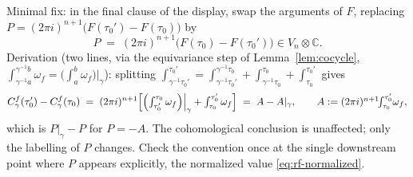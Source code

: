 \documentclass[11pt]{article}
\newcommand{\CC}{\mathbb{C}}
\begin{document}
\noindent
Minimal fix: in the final clause of the display, swap the arguments of
$F$, replacing $P = (2\pi i)^{n+1}\bigl(F(\tau_0') - F(\tau_0)\bigr)$ by
\[
  P \;=\; (2\pi i)^{n+1}\bigl(F(\tau_0) - F(\tau_0')\bigr) \in V_n
  \otimes \CC .
\]
Derivation (two lines, via the equivariance step of
Lemma~\ref{lem:cocycle}, $\int_{\gamma^{-1}a}^{\gamma^{-1}b}\omega_f =
\bigl(\int_a^b \omega_f\bigr)\big|_\gamma$): splitting
$\int_{\gamma^{-1}\tau_0'}^{\tau_0'} =
\int_{\gamma^{-1}\tau_0'}^{\gamma^{-1}\tau_0} +
\int_{\gamma^{-1}\tau_0}^{\tau_0} + \int_{\tau_0}^{\tau_0'}$ gives
\[
  C^f_\gamma(\tau_0') - C^f_\gamma(\tau_0)
  \;=\; (2\pi i)^{n+1}\Bigl[\Bigl(\textstyle\int_{\tau_0'}^{\tau_0}
  \omega_f\Bigr)\Big|_\gamma + \int_{\tau_0}^{\tau_0'}\omega_f\Bigr]
  \;=\; A - A|_\gamma,
  \qquad
  A := (2\pi i)^{n+1}\!\!\int_{\tau_0}^{\tau_0'}\!\omega_f ,
\]
which is $P|_\gamma - P$ for $P = -A$.  The cohomological conclusion is
unaffected; only the labelling of $P$ changes.  Check the convention once
at the single downstream point where $P$ appears explicitly, the
normalized value \eqref{eq:rf-normalized}.
\end{document}

